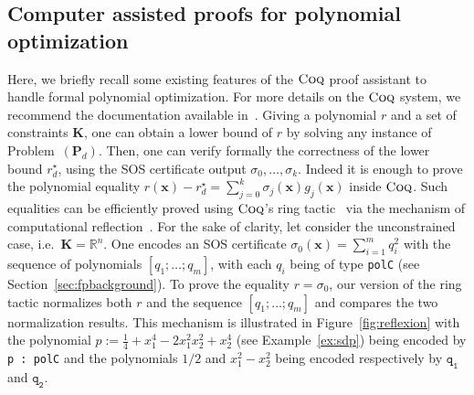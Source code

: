 \documentclass[preprint]{sigplanconf}
\newcommand{\code}[1]{\lstinline{#1}}
\newcommand{\R}{\mathbb{R}}
\newcommand{\x}{\mathbf{x}}
\def\P{\mathbf{P}}
\def\K{\mathbf{K}}
\newcommand{\coq}{\text{\sc Coq}}
\theoremstyle{plain}
\begin{document}
\subsection{Computer assisted proofs for polynomial optimization}
\label{sec:coqbackground}
Here, we briefly recall some existing features of the $\coq$ proof assistant to handle formal polynomial optimization.
For more details on the $\coq$ system, we recommend the
documentation available in~\cite{bertot2004interactive}.
Giving a polynomial $r$ and a set of constraints $\K$, one can obtain a lower bound of $r$ by solving any instance of Problem~$(\P_d)$. Then, one can verify formally the correctness of the lower bound $r_d^\star$, using the SOS certificate output $\sigma_0, \dots, \sigma_k$. Indeed it is enough to prove the polynomial equality $r(\x) - r_d^\star = \sum_{j=0}^k \sigma_j(\x) g_j(\x)$ inside $\coq$. Such equalities can be efficiently proved using $\coq$'s ring tactic~\cite{ring05} via the mechanism of computational reflection~\cite{Boutin97usingreflection}.
For the sake of clarity, let consider the unconstrained case, i.e.~$\K = \R^n$. One encodes an SOS certificate $\sigma_0(\x) = \sum_{i=1}^m q_i^2$  with the sequence of polynomials $[q_1; \dots; q_m]$, with each $q_i$ being of type \code{polC} (see Section~\ref{sec:fpbackground}). To prove the equality $r = \sigma_0$, our version of the ring tactic normalizes both $r$ and the sequence $[q_1; \dots; q_m]$ and compares the two normalization results. This mechanism is illustrated in Figure~\ref{fig:reflexion} with the polynomial $p := \frac{1}{4} + x_1^4 - 2 x_1^2 x_2^2 + x_2^4$ (see Example~\ref{ex:sdp}) being encoded by \code{p : polC}  and the polynomials $1/2$ and $x_1^2 - x_2^2$ being encoded respectively by $\mathtt{q_1}$ and $\mathtt{q_2}$. 
\end{document}
